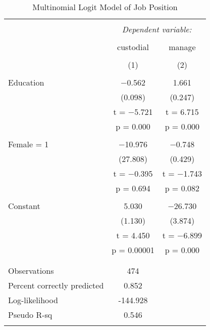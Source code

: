 \documentclass[
  12pt,
]{article}
\begin{document}
\begin{table}[t] \centering 
  \caption{Multinomial Logit Model of Job Position} 
  \label{job} 
\begin{tabular}{@{\extracolsep{5pt}}lcc} 
\\[-1.8ex]\hline 
\hline \\[-1.8ex] 
 & \multicolumn{2}{c}{\textit{Dependent variable:}} \\ 
\cline{2-3} 
\\[-1.8ex] & custodial & manage \\ 
\\[-1.8ex] & (1) & (2)\\ 
\hline \\[-1.8ex] 
 Education & $-$0.562 & 1.661 \\ 
  & (0.098) & (0.247) \\ 
  & t = $-$5.721 & t = 6.715 \\ 
  & p = 0.000 & p = 0.000 \\ 
  & & \\ 
 Female = 1 & $-$10.976 & $-$0.748 \\ 
  & (27.808) & (0.429) \\ 
  & t = $-$0.395 & t = $-$1.743 \\ 
  & p = 0.694 & p = 0.082 \\ 
  & & \\ 
 Constant & 5.030 & $-$26.730 \\ 
  & (1.130) & (3.874) \\ 
  & t = 4.450 & t = $-$6.899 \\ 
  & p = 0.00001 & p = 0.000 \\ 
  & & \\ 
\hline \\[-1.8ex] 
Observations & 474 &  \\ 
Percent correctly predicted & 0.852 &  \\ 
Log-likelihood & -144.928 &  \\ 
Pseudo R-sq & 0.546 &  \\ 
\hline 
\hline \\[-1.8ex] 
\end{tabular} 
\end{table}
\end{document}
